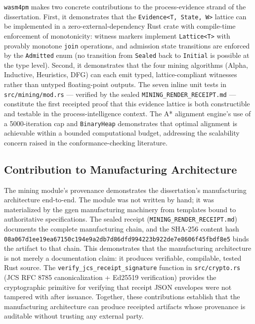 \texttt{wasm4pm} makes two concrete contributions to the process-evidence strand of the
dissertation. First, it demonstrates that the \texttt{Evidence<T,~State,~W>} lattice can be
implemented in a zero-external-dependency Rust crate with compile-time enforcement of
monotonicity: witness markers implement \texttt{Lattice<T>} with provably monotone \texttt{join}
operations, and admission state transitions are enforced by the \texttt{Admitted} enum (no
transition from \texttt{Sealed} back to \texttt{Initial} is possible at the type level). Second,
it demonstrates that the four mining algorithms (Alpha, Inductive, Heuristics, DFG) can each
emit typed, lattice-compliant witnesses rather than untyped floating-point outputs. The seven
inline unit tests in \texttt{src/mining/mod.rs} — verified by the sealed
\texttt{MINING\_RENDER\_RECEIPT.md} — constitute the first receipted proof that this evidence
lattice is both constructible and testable in the process-intelligence context. The A* alignment
engine's use of a 5000-iteration cap and \texttt{BinaryHeap} demonstrates that optimal alignment
is achievable within a bounded computational budget, addressing the scalability concern raised in
the conformance-checking literature.

\subsection{Contribution to Manufacturing Architecture}
\label{sec:sources-wasm4pm-contrib-manufacturing}

The mining module's provenance demonstrates the dissertation's manufacturing architecture
end-to-end. The module was not written by hand; it was materialized by the ggen manufacturing
machinery from templates bound to authoritative specifications. The sealed receipt
(\texttt{MINING\_RENDER\_RECEIPT.md}) documents the complete manufacturing chain, and the
SHA-256 content hash \texttt{08a067d1ee19ea67150c194e9a2db7d86dfd994223b922de7e8606f45fbdf8e5}
binds the artifact to that chain. This demonstrates that the manufacturing architecture is not
merely a documentation claim: it produces verifiable, compilable, tested Rust source. The
\texttt{verify\_jcs\_receipt\_signature} function in \texttt{src/crypto.rs} (JCS RFC 8785
canonicalization + Ed25519 verification) provides the cryptographic primitive for verifying that
receipt JSON envelopes were not tampered with after issuance. Together, these contributions
establish that the manufacturing architecture can produce receipted artifacts whose provenance is
auditable without trusting any external party.

